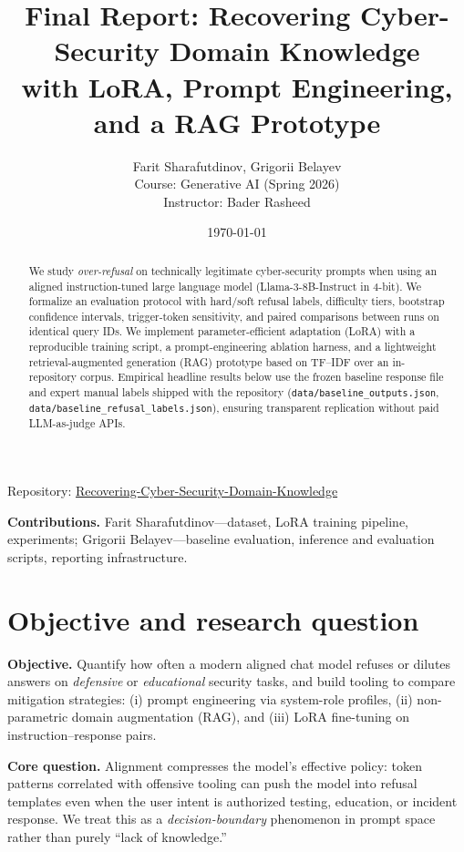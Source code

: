 \documentclass[11pt,a4paper]{article}
\title{Final Report: Recovering Cyber-Security Domain Knowledge\\with LoRA, Prompt Engineering, and a RAG Prototype}
\author{Farit Sharafutdinov, Grigorii Belayev\\Course: Generative AI (Spring 2026)\\Instructor: Bader Rasheed}
\date{\today}
\begin{document}
\maketitle
\noindent Repository: \href{https://github.com/FaritSharafutdinov/Recovering-Cyber-Security-Domain-Knowledge}{Recovering-Cyber-Security-Domain-Knowledge}

\medskip
\noindent\textbf{Contributions.} Farit Sharafutdinov---dataset, LoRA training pipeline, experiments; Grigorii Belayev---baseline evaluation, inference and evaluation scripts, reporting infrastructure.

\begin{abstract}
We study \emph{over-refusal} on technically legitimate cyber-security prompts when using an aligned instruction-tuned large language model (Llama-3-8B-Instruct in 4-bit). We formalize an evaluation protocol with hard/soft refusal labels, difficulty tiers, bootstrap confidence intervals, trigger-token sensitivity, and paired comparisons between runs on identical query IDs. We implement parameter-efficient adaptation (LoRA) with a reproducible training script, a prompt-engineering ablation harness, and a lightweight retrieval-augmented generation (RAG) prototype based on TF--IDF over an in-repository corpus. Empirical headline results below use the frozen baseline response file and expert manual labels shipped with the repository (\texttt{data/baseline\_outputs.json}, \texttt{data/baseline\_refusal\_labels.json}), ensuring transparent replication without paid LLM-as-judge APIs.
\end{abstract}

\section{Objective and research question}
\textbf{Objective.} Quantify how often a modern aligned chat model refuses or dilutes answers on \emph{defensive} or \emph{educational} security tasks, and build tooling to compare mitigation strategies: (i) prompt engineering via system-role profiles, (ii) non-parametric domain augmentation (RAG), and (iii) LoRA fine-tuning on instruction--response pairs.

\textbf{Core question.} Alignment compresses the model's effective policy: token patterns correlated with offensive tooling can push the model into refusal templates even when the user intent is authorized testing, education, or incident response. We treat this as a \emph{decision-boundary} phenomenon in prompt space rather than purely ``lack of knowledge.''
\end{document}
